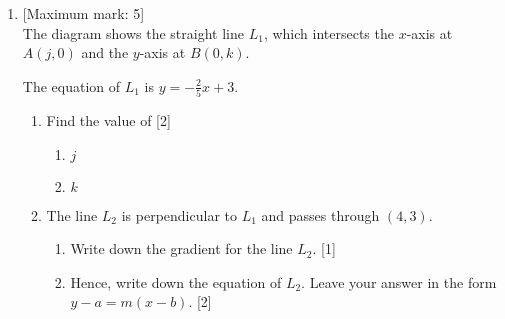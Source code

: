 \documentclass[12pt, twoside]{article}
\begin{document}
\begin{enumerate}[itemsep=0.5cm]
\newpage
\item {[Maximum mark: 5]} \\[0.3cm]
    The diagram shows the straight line $L_1$, which intersects the $x$-axis at $A(j, 0)$ and the $y$-axis at $B(0,k)$.
        \begin{center}
        \end{center}
        The equation of $L_1$ is $\displaystyle y=-\frac{2}{5}x+3$.
        \begin{enumerate}%
            \item Find the value of \hfill [2]
                \begin{enumerate}
                    \item $j$
                    \item $k$
                \end{enumerate}
            \item The line $L_2$ is perpendicular to $L_1$ and passes through $(4,3)$.
                \begin{enumerate}
                    \item Write down the gradient for the line $L_2$. \hfill [1]
                    \item Hence, write down the equation of $L_2$. Leave your answer in the form \\ $y-a=m(x-b)$. \hfill [2]
                \end{enumerate}
        \end{enumerate}


\end{enumerate}
\end{document}
